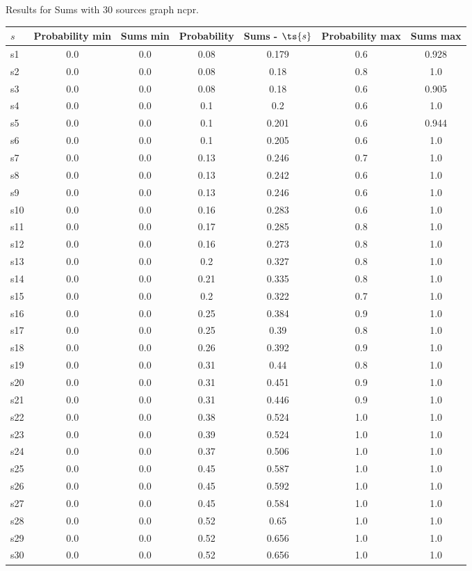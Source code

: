 \documentclass{article}
\begin{document}
\noindent Results for Sums with 30 sources graph ncpr.

\noindent\begin{tabular}{|l|c|c|c|c|c|c|}
\hline
$s$& Probability min & Sums min & Probability & Sums - $\ts{s}$ & Probability max & Sums max\\
\hline
s1 &0.0 & 0.0 & 0.08 & 0.179 & 0.6 & 0.928\\
\hline
s2 &0.0 & 0.0 & 0.08 & 0.18 & 0.8 & 1.0\\
\hline
s3 &0.0 & 0.0 & 0.08 & 0.18 & 0.6 & 0.905\\
\hline
s4 &0.0 & 0.0 & 0.1 & 0.2 & 0.6 & 1.0\\
\hline
s5 &0.0 & 0.0 & 0.1 & 0.201 & 0.6 & 0.944\\
\hline
s6 &0.0 & 0.0 & 0.1 & 0.205 & 0.6 & 1.0\\
\hline
s7 &0.0 & 0.0 & 0.13 & 0.246 & 0.7 & 1.0\\
\hline
s8 &0.0 & 0.0 & 0.13 & 0.242 & 0.6 & 1.0\\
\hline
s9 &0.0 & 0.0 & 0.13 & 0.246 & 0.6 & 1.0\\
\hline
s10 &0.0 & 0.0 & 0.16 & 0.283 & 0.6 & 1.0\\
\hline
s11 &0.0 & 0.0 & 0.17 & 0.285 & 0.8 & 1.0\\
\hline
s12 &0.0 & 0.0 & 0.16 & 0.273 & 0.8 & 1.0\\
\hline
s13 &0.0 & 0.0 & 0.2 & 0.327 & 0.8 & 1.0\\
\hline
s14 &0.0 & 0.0 & 0.21 & 0.335 & 0.8 & 1.0\\
\hline
s15 &0.0 & 0.0 & 0.2 & 0.322 & 0.7 & 1.0\\
\hline
s16 &0.0 & 0.0 & 0.25 & 0.384 & 0.9 & 1.0\\
\hline
s17 &0.0 & 0.0 & 0.25 & 0.39 & 0.8 & 1.0\\
\hline
s18 &0.0 & 0.0 & 0.26 & 0.392 & 0.9 & 1.0\\
\hline
s19 &0.0 & 0.0 & 0.31 & 0.44 & 0.8 & 1.0\\
\hline
s20 &0.0 & 0.0 & 0.31 & 0.451 & 0.9 & 1.0\\
\hline
s21 &0.0 & 0.0 & 0.31 & 0.446 & 0.9 & 1.0\\
\hline
s22 &0.0 & 0.0 & 0.38 & 0.524 & 1.0 & 1.0\\
\hline
s23 &0.0 & 0.0 & 0.39 & 0.524 & 1.0 & 1.0\\
\hline
s24 &0.0 & 0.0 & 0.37 & 0.506 & 1.0 & 1.0\\
\hline
s25 &0.0 & 0.0 & 0.45 & 0.587 & 1.0 & 1.0\\
\hline
s26 &0.0 & 0.0 & 0.45 & 0.592 & 1.0 & 1.0\\
\hline
s27 &0.0 & 0.0 & 0.45 & 0.584 & 1.0 & 1.0\\
\hline
s28 &0.0 & 0.0 & 0.52 & 0.65 & 1.0 & 1.0\\
\hline
s29 &0.0 & 0.0 & 0.52 & 0.656 & 1.0 & 1.0\\
\hline
s30 &0.0 & 0.0 & 0.52 & 0.656 & 1.0 & 1.0\\
\hline
\end{tabular}\\
\end{document}
